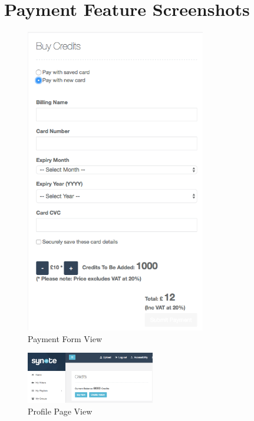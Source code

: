 \chapter{Payment Feature Screenshots}
\label{appendix:payment-feature-screenshots}

\begin{figure}[!hbt]
    \centering
  \includegraphics[width=0.7\textwidth]{screenshot-payment-form.png}
    \caption{Payment Form View}
  \label{fig:payment-form-screenshot}
\end{figure}

\begin{figure}[!hbt]
    \centering
  \includegraphics[width=0.5\textwidth]{screenshot-profile-page.png}
    \caption{Profile Page View}
  \label{fig:profile-screenshot}
\end{figure}

